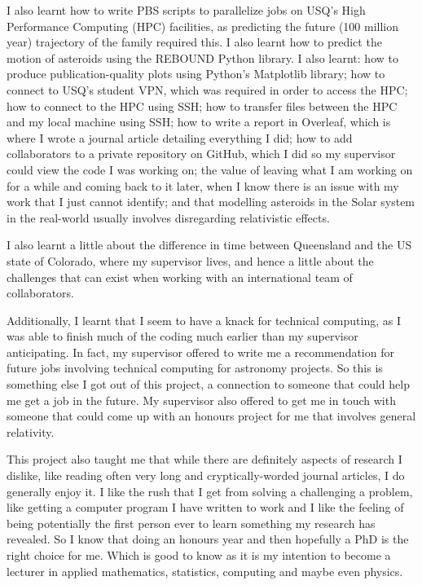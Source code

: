 \documentclass[12pt,a4paper,openright]{article}
\begin{document}
I also learnt how to write PBS scripts to parallelize jobs on USQ's High Performance Computing (HPC) facilities, as predicting the future (100 million year) trajectory of the family required this. I also learnt how to predict the motion of asteroids using the REBOUND Python library. I also learnt: how to produce publication-quality plots using Python's Matplotlib library; how to connect to USQ's student VPN, which was required in order to access the HPC; how to connect to the HPC using SSH; how to transfer files between the HPC and my local machine using SSH; how to write a report in Overleaf, which is where I wrote a journal article detailing everything I did; how to add collaborators to a private repository on GitHub, which I did so my supervisor could view the code I was working on; the value of leaving what I am working on for a while and coming back to it later, when I know there is an issue with my work that I just cannot identify; and that modelling asteroids in the Solar system in the real-world usually involves disregarding relativistic effects.

I also learnt a little about the difference in time between Queensland and the US state of Colorado, where my supervisor lives, and hence a little about the challenges that can exist when working with an international team of collaborators.

Additionally, I learnt that I seem to have a knack for technical computing, as I was able to finish much of the coding much earlier than my supervisor anticipating. In fact, my supervisor offered to write me a recommendation for future jobs involving technical computing for astronomy projects. So this is something else I got out of this project, a connection to someone that could help me get a job in the future. My supervisor also offered to get me in touch with someone that could come up with an honours project for me that involves general relativity. 

This project also taught me that while there are definitely aspects of research I dislike, like reading often very long and cryptically-worded journal articles, I do generally enjoy it. I like the rush that I get from solving a challenging a problem, like getting a computer program I have written to work and I like the feeling of being potentially the first person ever to learn something my research has revealed. So I know that doing an honours year and then hopefully a PhD is the right choice for me. Which is good to know as it is my intention to become a lecturer in applied mathematics, statistics, computing and maybe even physics. 
\end{document}
